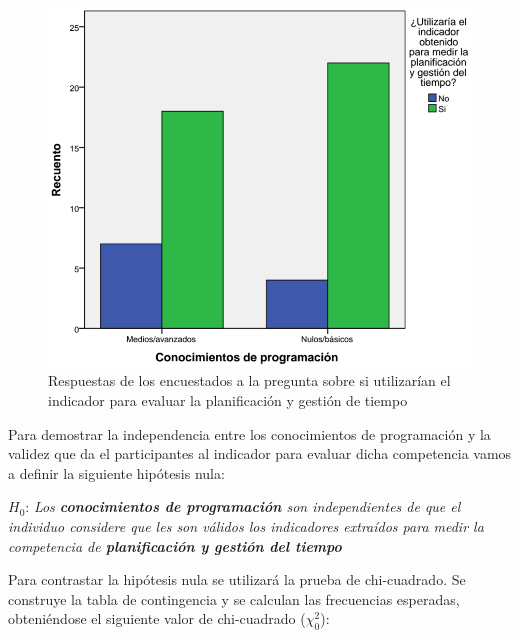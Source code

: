 \begin{figure}
  \begin{center}
    \includegraphics[scale=0.3]{barras_programacion_planificacion.png}
  \end{center}
  \caption{Respuestas de los encuestados a la pregunta sobre si utilizarían el indicador para evaluar la planificación y gestión de tiempo}
  \label{fig:app:barras:programacion:planificacion}
\end{figure}

Para demostrar la independencia entre los conocimientos de programación y la validez que da el participantes al indicador para evaluar dicha competencia vamos a definir la siguiente hipótesis nula:

\begin{mdframed}[style=hipotesis0]
$H_0$: \emph{Los \textbf{conocimientos de programación} son independientes de que el individuo considere que les son válidos los indicadores extraídos para medir la competencia de \textbf{planificación y gestión del tiempo}}
\end{mdframed}

Para contrastar la hipótesis nula se utilizará la prueba de chi-cuadrado. Se construye la tabla de contingencia y se calculan las frecuencias esperadas, obteniéndose el siguiente valor de chi-cuadrado ($\chi^2_0$): 

\begin{center}
\end{center}

